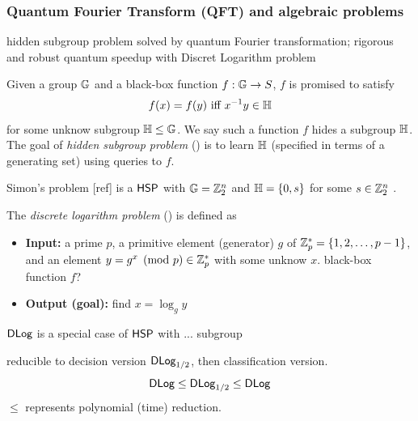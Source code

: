 \subsubsection{Quantum Fourier Transform (QFT) and algebraic problems}
hidden subgroup problem solved by quantum Fourier transformation\cite{childsQuantumAlgorithmsAlgebraic2010};
rigorous and robust quantum speedup with Discret Logarithm problem \cite{liuRigorousRobustQuantum2021} \cite{glickCovariantQuantumKernels2021}
\begin{problem}\label{prm:hidden_subgroup}
	Given a group $\mathbb{G}$ and a black-box function $f:\mathbb{G}\to S$, 
	$f$ is promised to satisfy 
	\begin{equation}
		f(x) =f(y) \text{ iff } x^{-1}y \in \mathbb{H} 
	\end{equation}
	for some unknow subgroup $\mathbb{H} \le \mathbb{G}$.
	We say such a function $f$ hides a subgroup $\mathbb{H}$.
	The goal of \emph{hidden subgroup problem} (\hsp) is to learn $\mathbb{H}$
	(specified in terms of a generating set) using queries to $f$.
\end{problem}
\begin{remark}
	Simon's problem [ref] 
	is a $\textsf{HSP}$ with $\mathbb{G} = \mathbb{Z}^n_2$ and $\mathbb{H} = \qty{ 0, s }$ for some $s \in \mathbb{Z}_2^n$ .
\end{remark}
\begin{problem}\label{prm:dlog}
	The \emph{discrete logarithm problem} (\dlog) is defined as
	\begin{itemize}
		\item \textbf{Input:} a prime $p$, a primitive element (generator) $g$ of $\mathbb{Z}_p^*=\qty{1,2,\dots,p-1}$, and an element $y=g^x \pmod{p} \in\mathbb{Z}_p^*$ with some unknow $x$. black-box function $f$?
		\item \textbf{Output (goal):} find $x=\log_g y$
	\end{itemize}
	$\textsf{DLog}$ is a special case of $\textsf{HSP}$ with ... subgroup 
\end{problem}
reducible to decision version $\textsf{DLog}_{1/2}$, then classification version.
\begin{equation}
	\textsf{DLog} \le \textsf{DLog}_{1/2} \le \textsf{DLog}
\end{equation}
$\le$ represents polynomial (time) reduction.


